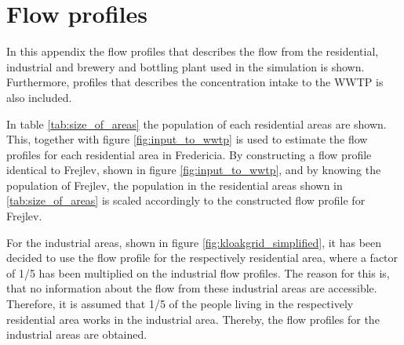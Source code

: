 \newpage
\section{Flow profiles}\label{app:flow_profiles}
In this appendix the flow profiles that describes the flow from the residential, industrial and brewery and bottling plant used in the simulation is shown. Furthermore, profiles that describes the concentration intake to the WWTP is also included.


In table \ref{tab:size_of_areas} the population of each residential areas are shown. This, together with figure \ref{fig:input_to_wwtp} is used to estimate the flow profiles for each residential area in Fredericia. By constructing a flow profile identical to Frejlev, shown in figure \ref{fig:input_to_wwtp}, and by knowing the population of Frejlev, the population in the residential areas shown in \ref{tab:size_of_areas} is scaled accordingly to the constructed flow profile for Frejlev.

For the industrial areas, shown in figure \ref{fig:kloakgrid_simplified}, it has been decided to use the flow profile for the respectively residential area, where a factor of 1/5 has been multiplied on the industrial flow profiles. The reason for this is, that no information about the flow from these industrial areas are accessible. Therefore, it is assumed that 1/5 of the people living in the respectively residential area works in the industrial area. Thereby, the flow profiles for the industrial areas are obtained.

